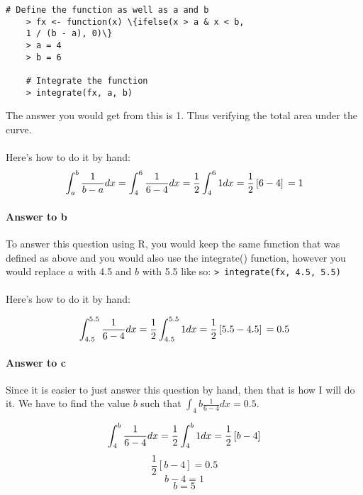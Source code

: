\documentclass{article}
\begin{document}
	\begin{lstlisting}[frame=single]
    # Define the function as well as a and b
    > fx <- function(x) \{ifelse(x > a & x < b,
    1 / (b - a), 0)\}
    > a = 4
    > b = 6
    
    # Integrate the function
    > integrate(fx, a, b)
	\end{lstlisting}
	
	\noindent The answer you would get from this is 1. Thus verifying the total area under the curve.
	\\ \\
	\noindent Here's how to do it by hand:
	\begin{displaymath}
		\int_{a}^{b} \frac{1}{b - a} dx \\
		= \int_{4}^{6} \frac{1}{6 - 4} dx \\
		= \frac{1}{2} \int_{4}^{6} 1 dx \\
		= \frac{1}{2} \left[ 6 - 4 \right] \\
		= 1
	\end{displaymath}
	\clearpage
	
	\paragraph{Answer to b}
	To answer this question using R, you would keep the same function that was defined as above 
	and you would also use the integrate() function, however you would replace $a$ with 4.5 and 
	$b$ with 5.5 like so: \texttt{> integrate(fx, 4.5, 5.5)} \\ \\
	Here's how to do it by hand:
	
	\begin{displaymath}
		\int_{4.5}^{5.5} \frac{1}{6 - 4} dx \\
		= \frac{1}{2} \int_{4.5}^{5.5} 1 dx \\
		= \frac{1}{2} \left[5.5 - 4.5 \right] \\
		= 0.5
	\end{displaymath}
	
	\paragraph{Answer to c}
	Since it is easier to just answer this question by hand, then that is how I will do it. We have to 
	find the value $b$ such that $\int_{4}{b} \frac{1}{6 - 4} dx = 0.5$.
	
	\begin{displaymath}
		\int_{4}^{b} \frac{1}{6 - 4} dx \\
		= \frac{1}{2} \int_{4}^{b} 1 dx \\
		= \frac{1}{2} \left[b - 4 \right]
	\end{displaymath}
	\begin{displaymath}
		\frac{1}{2} \left[b - 4 \right] = 0.5
	\end{displaymath}
	\begin{displaymath}
		b - 4 = 1
	\end{displaymath}
	\begin{displaymath}
		b = 5
	\end{displaymath}
	
\end{document}
